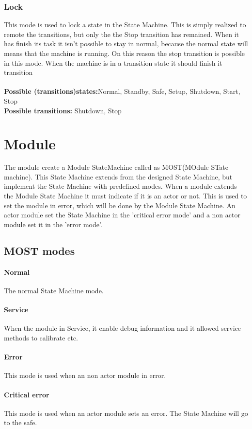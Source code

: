 \documentclass[12pt,a4paper]{report}
\begin{document}
\subsubsection{Lock}This mode is used to lock a state in the State Machine. This is simply realized to remote the transitions, but only the the Stop transition has remained. When it has finish its task it isn't possible to stay in normal, because the normal state will means that the machine is running. On this reason the stop transition is possible in this mode. When the machine is in a transition state it should finish it transition\\\\
\textbf{Possible (transitions)states:}Normal, Standby, Safe, Setup, Shutdown, Start, Stop\\
\textbf{Possible transitions:} Shutdown, Stop

\section{Module}
The module create a Module StateMachine called as MOST(MOdule STate machine). This State Machine extends from the designed State Machine, but implement the State Machine with predefined modes. When a module extends the Module State Machine it must indicate if it is an actor or not. This is used to set the module in error, which will be done by the Module State Machine. An actor module set the State Machine in the 'critical error mode' and a non actor module set it in the 'error mode'. 

\subsection{MOST modes}
\paragraph{Normal}The normal State Machine mode.
\paragraph{Service}When the module in Service, it enable debug information and it allowed service methods to calibrate etc.
\paragraph{Error}This mode is used when an non actor module in error.
\paragraph{Critical error}This mode is used when an actor module sets an error. The State Machine will go to the safe.
\end{document}

